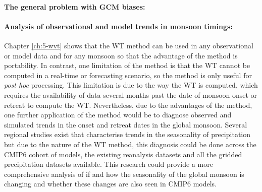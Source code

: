 \paragraph{The general problem with GCM biases:}

\paragraph{Analysis of observational and model trends in monsoon timings:}
Chapter \ref{ch:5-wvt} shows that the WT method can be used in any observational or model data and for any monsoon so that the advantage of the method is portability.
In contrast, one limitation of the method is that the WT cannot be computed in a real-time or forecasting scenario, so the method is only useful for \textit{post hoc} processing. 
This limitation is due to the way the WT is computed, which requires the availability of data several months past the date of monsoon onset or retreat to compute the WT. 
Nevertheless, due to the advantages of the method, one further application of the method would be to diagnose observed and simulated trends in the onset and retreat dates in the global monsoon.
Several regional studies exist that characterise trends in the seasonality of precipitation but due to the nature of the WT method, this diagnosis could be done across the CMIP6 cohort of models, the existing reanalysis datasets and all the gridded precipitation datasets available.  
This research could provide a more comprehensive analysis of if and how the seasonality of the global monsoon is changing and whether these changes are also seen in CMIP6 models.

